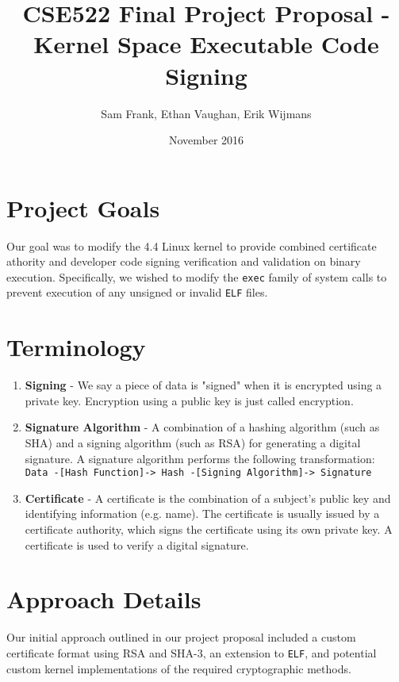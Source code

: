 \documentclass[12pt, letterpaper]{report}
\title{CSE522 Final Project Proposal - Kernel Space Executable Code Signing}
\author{Sam Frank, Ethan Vaughan, Erik Wijmans}
\date{November 2016}
\begin{document}
\maketitle

\tableofcontents

\section{Project Goals}
	Our goal was to modify the 4.4 Linux kernel to provide combined certificate athority and developer code signing verification and validation on binary execution. 
	Specifically, we wished to modify the \texttt{exec} family of system calls to prevent execution of any unsigned or invalid \texttt{ELF} files.

\section{Terminology}
	\begin{enumerate}
		\item \textbf{Signing} - We say a piece of data is "signed" when it is encrypted using a private key. Encryption using a public key is just called encryption.
		\item \textbf{Signature Algorithm} - A combination of a hashing algorithm (such as SHA) and a signing algorithm (such as RSA) for generating a digital signature. A signature algorithm performs the following transformation: \\
		\texttt{Data -[Hash Function]-> Hash -[Signing Algorithm]-> Signature}
		\item \textbf{Certificate} - A certificate is the combination of a subject's public key and identifying information (e.g. name). The certificate is usually issued by a certificate authority, which signs the certificate using its own private key. A certificate is used to verify a digital signature.
	\end{enumerate}

\section{Approach Details}

	Our initial approach outlined in our project proposal included a custom certificate format using RSA and SHA-3, an extension to \texttt{ELF},
	and potential custom kernel implementations of the required cryptographic methods. \\
	
\end{document}
